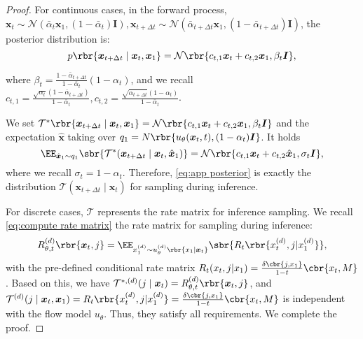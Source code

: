 \begin{proof}

For continuous cases, in the forward process, $\boldsymbol{x}_t \sim \mathcal{N}(\bar{\alpha}_t \boldsymbol{x}_1, (1-\bar{\alpha}_t)\boldsymbol{I}), \boldsymbol{x}_{t+\Delta t} \sim \mathcal{N}(\bar{\alpha}_{t+\Delta t} \boldsymbol{x}_1, (1-\bar{\alpha}_{t+\Delta t})\boldsymbol{I})$, the posterior distribution is:
\begin{equation}
    p\rbr{\boldsymbol{x}_{t+\Delta t} \mid \boldsymbol{x}_{t}, \boldsymbol{x}_1} = \mathcal{N}\rbr{c_{t,1}\boldsymbol{x}_{t}+c_{t,2} \boldsymbol{x}_1, \beta_t \boldsymbol{I}} , 
\end{equation}

where $\beta_t =\frac{1-\bar{\alpha}_{t+\Delta t}}{1-\bar{\alpha}_{t}}(1-\alpha_t) $, and we recall $c_{t,1}= \frac{\sqrt{\alpha_t}(1-\bar{\alpha}_{t+\Delta t})}{1-\bar{\alpha}_t},  c_{t,2} = \frac{\sqrt{\bar{\alpha}_{t+\Delta t}}(1-\alpha_t)}{1-\bar{\alpha}_t}$.

We set $\mathcal{T^\ast}\rbr{\boldsymbol{x}_{t+\Delta t} \mid \boldsymbol{x}_{t}, \boldsymbol{x}_1} = \mathcal{N}\rbr{c_{t,1}\boldsymbol{x}_{t}+c_{t,2} \boldsymbol{x}_1, \beta_t \boldsymbol{I}}$ and the expectation $\hat{\boldsymbol{x}}$ taking over $q_1 =  N\rbr{u_\theta(\boldsymbol{x}_t, t), ( 1-\alpha_t) \boldsymbol{I}}$. It holds
\begin{equation}\label{eq:app posterior}
    \EE_{{\hat{\boldsymbol{x}}}_1 \sim q_1} \sbr{\mathcal{T}^\ast(\boldsymbol{x}_{t + \Delta t} \mid \boldsymbol{x}_{t}, \hat{{\boldsymbol{x}}}_1)} = \mathcal{N}\rbr{c_{t,1}\boldsymbol{x}_{t}+c_{t,2} \hat{\boldsymbol{x}}_1, \sigma_t \boldsymbol{I}},
\end{equation}
where we recall $\sigma_t = 1 -\alpha_t$. Therefore, \eqref{eq:app posterior} is exactly the distribution $\mathcal{T}(\boldsymbol{x}_{t + \Delta t} \mid \boldsymbol{x}_{t})  $
 for sampling during inference.


For discrete cases,  $\mathcal{T}$ represents the rate matrix for inference sampling. We recall \eqref{eq:compute rate matrix} the rate matrix for sampling during inference:
\begin{equation*}
     R_{\theta,t}^{(d)} \rbr{\boldsymbol{x}_t, j} = \EE_{{x}_1^{(d)} \sim u_{\theta}^{(d)}\rbr{{x}_1\mid \boldsymbol{x}_t}}\sbr{R_t\rbr{x_t^{(d)}, j|x_1^{(d)}}},
\end{equation*}
with the pre-defined conditional rate matrix $R_t(x_t,j|x_1) = \frac{\delta \cbr{j,x_1}}{1-t} \cbr{x_t, M}$. Based on this, we have $\mathcal{T}^{\ast, (d)}(j\mid \boldsymbol{x}_t) = R_{\theta,t}^{(d)} \rbr{\boldsymbol{x}_t, j} $, and $\mathcal{T}^{(d)}(j\mid \boldsymbol{x}_t, \boldsymbol{x}_1) = R_t\rbr{x_t^{(d)}, j|x_1^{(d)}}= \frac{\delta \cbr{j,x_1}}{1-t} \cbr{x_t, M}   $ is independent with the flow model $u_\theta$. Thus, they satisfy all requirements. We complete the proof.



    
\end{proof}



